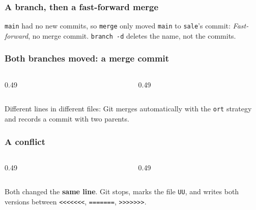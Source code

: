 \documentclass[aspectratio=169,10pt,compress]{beamer}
\begin{document}
\begin{frame}[t,fragile] \frametitle{A branch, then a fast-forward merge}

  \vspace{0.1em}
  \small
  \texttt{main} had no new commits, so \texttt{merge} only moved \texttt{main} to \texttt{sale}'s commit: \emph{Fast-forward}, no merge commit.
  \texttt{branch -d} deletes the name, not the commits.
\end{frame}




\begin{frame}[t,fragile] \frametitle{Both branches moved: a merge commit}
  \begin{columns}[T]
    \begin{column}{0.49\textwidth}
    \end{column}
    \begin{column}{0.49\textwidth}
    \end{column}
  \end{columns}

  \vspace{0.1em}
  \small
  Different lines in different files: Git merges automatically with the \texttt{ort} strategy and records a commit with two parents.
\end{frame}




\begin{frame}[t,fragile] \frametitle{A conflict}
  \begin{columns}[T]
    \begin{column}{0.49\textwidth}
    \end{column}
    \begin{column}{0.49\textwidth}
    \end{column}
  \end{columns}

  \vspace{0.1em}
  \small
  Both changed the \textbf{same line}. Git stops, marks the file \texttt{UU}, and writes both versions between \texttt{<<<<<<<}, \texttt{=======}, \texttt{>>>>>>>}.
\end{frame}
\end{document}
